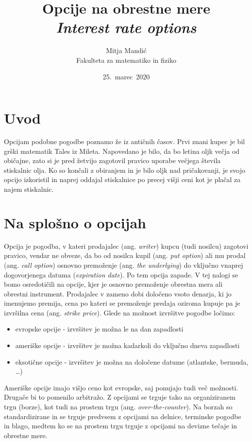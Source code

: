 \documentclass[a4paper]{article}
\title{Opcije na obrestne mere\\
    \textit{Interest rate options}}
\author{Mitja Mandić \\ Fakulteta za matematiko in fiziko}
\date{25.\ marec\ 2020}
\begin{document}
\maketitle

\pagebreak

\begin{abstract}

\end{abstract}
\pagebreak
\tableofcontents
\pagebreak

\section{Uvod}
Opcijam podobne pogodbe poznamo že iz antičnih časov. Prvi znani kupec je bil grški matematik Tales iz Mileta.
Napovedano je bilo, da bo letina oljk večja od običajne, zato si je pred žetvijo zagotovil pravico uporabe večjega
števila stiskalnic olja. Ko so končali z obiranjem in je bilo oljk nad pričakovanji, je svojo opcijo izkoristil in naprej oddajal
stiskalnice po precej višji ceni kot je plačal za najem stiskalnic.

\section{Na splošno o opcijah}

Opcija je pogodba, v kateri prodajalec (ang. \textit{writer}) kupcu (tudi nosilcu) zagotovi pravico, 
vendar ne obveze, da bo od nosilca kupil (ang. \textit{put option})
ali mu prodal (ang. \textit{call option}) osnovno premoženje (ang. \textit{the underlying}) do 
vključno vnaprej dogovorjenega datuma (\textit{expiration date}).
Po tem opcija zapade.  V tej nalogi se bomo osredotičili na opcije, kjer je
osnovno premoženje obrestna mera ali obrestni instrument. Prodajalec v zameno dobi določeno vsoto denarja, ki jo imenujemo premija, 
cena po kateri se premoženje predaja oziroma kupuje pa je izvršilna cena (ang. \textit{strike price}).
Glede na možnost izvršitve pogodbe ločimo:
\begin{itemize}
    \item evropske opcije - izvršitev je možna le na dan zapadlosti
    \item ameriške opcije - izvršitev je možna kadarkoli do vključno dneva zapadlosti
    \item eksotične opcije - izvršitev je možna na določene datume (atlantske, bermuda, \ldots)
\end{itemize}

Ameriške opcije imajo višjo ceno kot evropske, saj ponujajo tudi več možnosti. Drugače bi to pomenilo arbitražo.
Z opcijami se trguje tako na organiziranem trgu (borze), kot tudi na prostem trgu (ang. \textit{over-the-counter}). Na borzah so
standardizirane in se trguje predvsem z opcijami na delnice, terminske pogodbe in blago, medtem ko se na prostem trgu trguje z opcijami
na devizne tečaje in obrestne mere.
\end{document}
